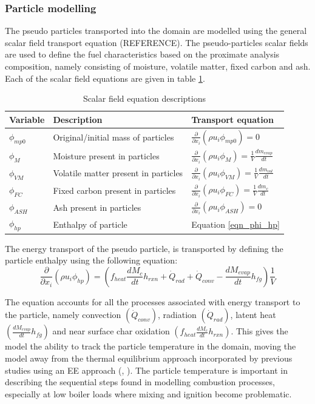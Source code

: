 \documentclass[review]{elsarticle}
\begin{document}
\subsubsection{Particle modelling}
The pseudo particles transported into the domain are modelled using the general scalar field transport equation (REFERENCE). The pseudo-particles scalar fields are used to define the fuel characteristics based on the proximate analysis composition, namely consisting of moisture, volatile matter, fixed  carbon and ash. Each of the scalar field equations are given in table \ref{tab_scalars}.

\begin{table}[h!]
\centering
\caption{Scalar field equation descriptions}\label{tab_scalars}       
\begin{tabular}{lll}
\hline
Variable &Description& Transport equation \\
\hline
$\phi_{mp0}$ &Original/initial mass of particles& $\frac{\partial}{\partial x_{i}}(\rho u_{i} \phi_{mp0})=0$\\
$\phi_{M}$&Moisture present in particles&$\frac{\partial}{\partial x_{i}}(\rho u_{i} \phi_{M})=\frac{1}{V} \frac{dm_{evap}}{dt}$\\
$\phi_{VM}$&Volatile matter present in particles&  $\frac{\partial}{\partial x_{i}}(\rho u_{i} \phi_{VM})=\frac{1}{V}\frac{dm_{vol}}{dt}$\\
$\phi_{FC}$&Fixed carbon present in particles&$\frac{\partial}{\partial x_{i}}(\rho u_{i} \phi_{FC})=\frac{1}{V}\frac{dm_c}{dt}$\\
$\phi_{ASH}$&Ash present in particles&$\frac{\partial}{\partial x_{i}}(\rho u_{i} \phi_{ASH})=0$\\
$\phi_{hp}$&Enthalpy of particle&Equation \eqref{eqn_phi_hp}\\
\hline
\end{tabular}
\end{table}

The energy transport of the pseudo particle, is transported by defining the particle enthalpy using the following equation:
\begin{equation}\label{eqn_phi_hp}
\frac{\partial}{\partial x_{i}}(\rho u_{i} \phi_{hp})=\left(f_{heat}\frac{dM_{c}}{dt}h_{rxn} + \dot{Q}_{rad} + \dot{Q}_{conv} - \frac{dM_{evap}}{dt}h_{fg}\right)\frac{1}{V}
\end{equation}

The equation accounts for all the processes associated with energy transport to the particle, namely convection $\left(\dot{Q}_{conv}\right)$, radiation $\left(\dot{Q}_{rad}\right)$, latent heat $\left(\frac{dM_{evap}}{dt}h_{fg}\right)$ and near surface char oxidation $\left(f_{heat}\frac{dM_{c}}{dt}h_{rxn}\right)$. This gives the model the ability to track the particle temperature in the domain, moving the model away from the thermal equilibrium approach incorporated by previous studies using an EE approach (\cite{epple}, \cite{knaus}). The particle temperature is important in describing the sequential steps found in modelling combustion processes, especially at low boiler loads where mixing and ignition become problematic.
\end{document}

